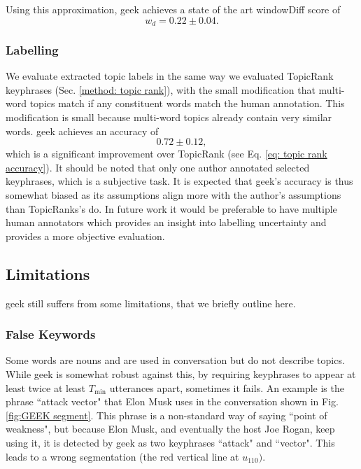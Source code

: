         Using this approximation, \gls{geek} achieves a state of the art windowDiff score of
        \begin{equation}
            w_d = 0.22 \pm 0.04.
        \end{equation}


    \subsubsection{Labelling}
        We evaluate extracted topic labels in the same way we evaluated TopicRank \glspl{keyphrase} (Sec. \ref{method: topic rank}), with the small modification that multi-word topics match if any constituent words match the human annotation. This modification is small because multi-word topics already contain very similar words. \gls{geek} achieves an accuracy of
        \begin{equation}
            0.72 \pm 0.12,
        \end{equation}
        which is a significant improvement over TopicRank (see Eq. \ref{eq: topic rank accuracy}). It should be noted that only one author annotated selected \glspl{keyphrase}, which is a subjective task. It is expected that \gls{geek}'s accuracy is thus somewhat biased as its assumptions align more with the author's assumptions than TopicRanks's do. In future work it would be preferable to have multiple human annotators which provides an insight into labelling uncertainty and provides a more objective evaluation.

    \subsection{Limitations}
    \gls{geek} still suffers from some limitations, that we briefly outline here.

    \subsubsection{False Keywords}
        Some words are nouns and are used in conversation but do not describe topics. While \gls{geek} is somewhat robust against this, by requiring \glspl{keyphrase} to appear at least twice at least $T_{\text{min}}$ \glspl{utterance} apart, sometimes it fails. An example is the phrase ``attack vector" that Elon Musk uses in the conversation shown in Fig. \ref{fig:GEEK segment}. This phrase is a non-standard way of saying ``point of weakness", but because Elon Musk, and eventually the host Joe Rogan, keep using it, it is detected by \gls{geek} as two \glspl{keyphrase} ``attack" and ``vector". This leads to a wrong segmentation (the red vertical line at $u_{110})$.

